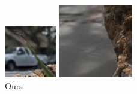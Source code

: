 \documentclass[10pt,twocolumn,letterpaper]{article}
\begin{document}
\begin{figure}[p]
\begin{multicols}{2}
\begin{multicols}{3}
            \includegraphics[width=\linewidth]{rock_crop_leaf/ours_05_05.png}\par\vspace{0.1in}\includegraphics[width=\linewidth]{rock_crop_walk/ours_05_05.png}\par\caption*{Ours}

\end{multicols}
\end{multicols}
\end{figure}
\end{document}

